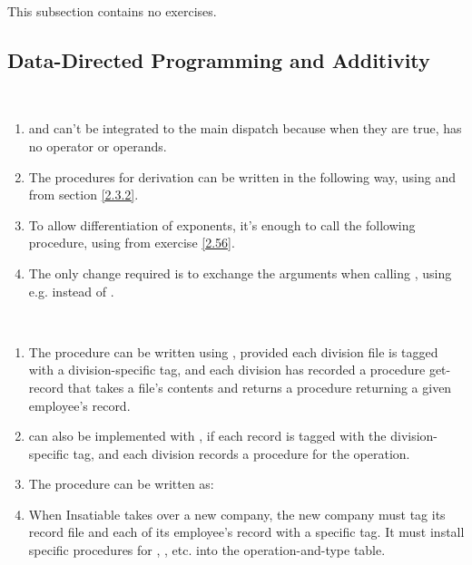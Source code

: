 This subsection contains no exercises.

\subsection{Data-Directed Programming and Additivity}

\begin{exe}[2.73]
    \label{2.73}
    \ \vspace{-20pt}
    \begin{enumerate}
        \item {} and  can’t be integrated to 
            the main dispatch because when they are true,  has no 
            operator or operands.

        \item The procedures for derivation can be written in the following way, 
            using  and  from section 
            \ref{2.3.2}.

        \item To allow differentiation of exponents, it’s enough to call the 
            following procedure, using  from exercise 
            \ref{2.56}.

        \item The only change required is to exchange the arguments when calling 
            , using e.g.  instead of 
            .
    \end{enumerate}
\end{exe}

\begin{exe}[2.74]
    \ \vspace{-20pt}
    \begin{enumerate}
        \item The  procedure can be written using 
            , provided each division file is tagged with 
            a division-specific tag, and each division has recorded a procedure 
            get-record that takes a file’s contents and returns a procedure 
            returning a given employee’s record.
        \item {} can also be implemented with 
            , if each record is tagged with the 
            division-specific tag, and each division records a procedure for the 
             operation.
        \item The  procedure can be written as:
        \item When Insatiable takes over a new company, the new company must tag 
            its record file and each of its employee’s record with a specific 
            tag. It must install specific procedures for , 
            , etc. into the operation-and-type table.
    \end{enumerate}
\end{exe}

